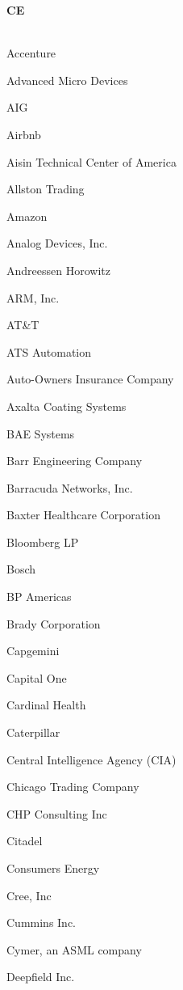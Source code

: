 \documentclass[twoside]{article}
\begin{document}
\begin{center}
\begin{multicols}{5}
        \vspace{1em}
        {\fontsize{14}{16}\selectfont \bf CE}\\
        \vspace{-1em}
        ~\hrulefill~
        \vspace{-.9em}
        \begin{FlushLeft}
        \begin{compactitem}
        \item Accenture
\item Advanced Micro Devices
\item AIG
\item Airbnb
\item Aisin Technical Center of America
\item Allston Trading
\item Amazon
\item Analog Devices, Inc.
\item Andreessen Horowitz
\item ARM, Inc.
\item AT\&T
\item ATS Automation
\item Auto-Owners Insurance Company
\item Axalta Coating Systems
\item BAE Systems
\item Barr Engineering Company
\item Barracuda Networks, Inc.
\item Baxter Healthcare Corporation
\item Bloomberg LP
\item Bosch
\item BP Americas
\item Brady Corporation
\item Capgemini
\item Capital One
\item Cardinal Health
\item Caterpillar
\item Central Intelligence Agency (CIA)
\item Chicago Trading Company
\item CHP Consulting Inc
\item Citadel
\item Consumers Energy
\item Cree, Inc
\item Cummins Inc.
\item Cymer, an ASML company
\item Deepfield Inc.

\end{compactitem}
\end{FlushLeft}
\end{multicols}
\end{center}
\end{document}

